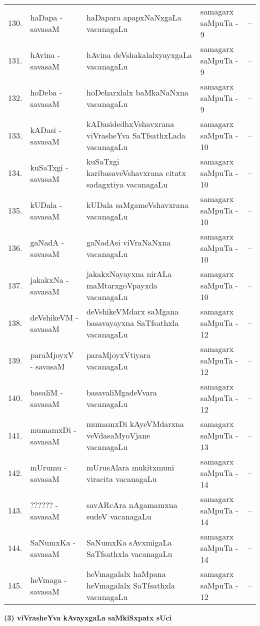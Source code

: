 {\begin{longtable}{rl>{\raggedright}p{5.5cm}lc}
130. & haDapa - savasaM & haDapara apapxNaNxgaLa vacanagaLu & samagarx saMpuTa - 9 & --\\
131. & hAvina - savasaM & hAvina deVshakalalxyayxgaLa vacanagaLu & samagarx saMpuTa - 9 & --\\
132. & hoDeba - savasaM & hoDeharxlalx baMkaNaNxna vacanagaLu & samagarx saMpuTa - 9 & --\\
133. &  kADasi - savasaM & kADasidedhxVshavxrana viVrasheYva SaTfsathxLada vacanagaLu & samagarx saMpuTa - 10 & --\\
134. & kuSaTxgi - savasaM & kuSaTxgi karibasaveVshavxrana citatx sadagxtiya vacanagaLu & samagarx saMpuTa - 10 & --\\
135. & kUDala - savasaM & kUDala saMgameVshavxrana vacanagaLu & samagarx saMpuTa - 10 & --\\
136. & gaNadA - savasaM & gaNadAsi viVraNaNxna vacanagaLu & samagarx saMpuTa - 10 & --\\
137. & jakakxNa - savasaM & jakakxNayayxna nirALa maMtarxgoVpayxda vacanagaLu & samagarx saMpuTa - 10 & --\\
138. & deVshikeVM - savasaM & deVshikeVMdarx saMgana basavayayxna SaTfsathxla vacanagaLu & samagarx saMpuTa - 12 & --\\
139. & paraMjoyxV - savasaM & paraMjoyxVtiyara vacanagaLu & samagarx saMpuTa - 12 & --\\
140. & basaliM - savasaM & basavaliMgadeVvara vacanagaLu & samagarx saMpuTa - 12 & --\\
141. & mumamxDi - savasaM & mumamxDi kAyeVMdarxna veVdasaMyoVjane vacanagaLu & samagarx saMpuTa - 13 & --\\
142. & mUrumu - savasaM & mUrusAlara mukitxmuni viracita vacanagaLu & samagarx saMpuTa - 14 & --\\
143. & ?????? - savasaM &  savARcAra nAgamamxna sudeV vacanagaLu & samagarx saMpuTa - 14 & --\\
144. & SaNumxKa - savasaM & SaNumxKa sAvxmigaLa SaTfsathxla vacanagaLu & samagarx saMpuTa - 14 & --\\
145. & heVmaga - savasaM & heVmagalalx haMpana heVmagalalx SaTfsathxla vacanagaLu & samagarx saMpuTa - 12 & --\\
\hline
\end{longtable}}

\vskip 1cm

\begin{center}
{\large\bf (3) viVrasheYva kAvayxgaLa saMkiSxpatx sUci}
\end{center}


